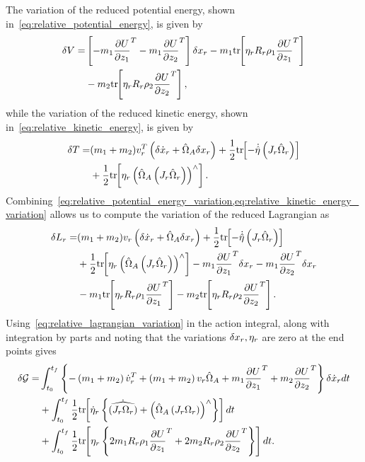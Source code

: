 The variation of the reduced potential energy, shown in~\cref{eq:relative_potential_energy}, is given by
\begin{align}\label{eq:relative_potential_energy_variation}
    \delta V =& \left[ -m_1 \frac{\partial U}{\partial z_1}^T - m_1 \frac{\partial U}{\partial z_2}^T \right] \delta x_r - m_1 \mathrm{tr}\negthickspace\left[  \eta_r R_r \rho_1 \frac{\partial U}{\partial z_1}^T \right] \nonumber\\
              & {} - m_2 \mathrm{tr}\negthickspace\left[ \eta_r R_r \rho_2 \frac{\partial U}{\partial z_2}^T \right],
\end{align}
while the variation of the reduced kinetic energy, shown in~\cref{eq:relative_kinetic_energy}, is given by
\begin{align}\label{eq:relative_kinetic_energy_variation}
    \delta T =& (m_1 + m_2) v_r^T \left( \delta \dot{x}_r +  \hat{\Omega}_A \delta x_r \right) + \frac{1}{2} \mathrm{tr}\negthickspace\left[  -\dot{\hat{\eta}}\left( J_r  \hat{\Omega}_r  \right) \right] \nonumber\\
              & {} +\frac{1}{2} \mathrm{tr}\negthickspace\left[ \eta_r \left(  \hat{\Omega}_A\left( J_r  \hat{\Omega}_r \right) \right)^\wedge \right] .
\end{align}
Combining~\cref{eq:relative_potential_energy_variation,eq:relative_kinetic_energy_variation} allows us to compute the variation of the reduced Lagrangian as
\begin{align}\label{eq:relative_lagrangian_variation}
    \delta L_r =& (m_1 + m_2) v_r \left( \delta \dot{x}_r +  \hat{\Omega}_A \delta x_r \right) + \frac{1}{2} \mathrm{tr}\negthickspace\left[  -\dot{\hat{\eta}}\left( J_r  \hat{\Omega}_r  \right) \right] \nonumber\\
                & {} +\frac{1}{2} \mathrm{tr}\negthickspace\left[ \eta_r \left(  \hat{\Omega}_A\left( J_r  \hat{\Omega}_r \right) \right)^\wedge \right] -m_1 \frac{\partial U}{\partial z_1}^T \delta x_r - m_1 \frac{\partial U}{\partial z_2}^T \delta x_r \nonumber\\
                & {} - m_1 \mathrm{tr}\negthickspace\left[  \eta_r  R_r \rho_1 \frac{\partial U}{\partial z_1}^T \right] - m_2 \mathrm{tr}\negthickspace\left[ \eta_r  R_r \rho_2 \frac{\partial U}{\partial z_2}^T \right].
\end{align}
Using~\cref{eq:relative_lagrangian_variation} in the action integral, along with integration by parts and noting that the variations \( \delta x_r, \eta_r\) are zero at the end points gives 
\begin{align}\label{eq:relative_hamiltons_principle}
    \delta \mathcal{G} =& \int_{t_0}^{t_f} \left\{-\left( m_1+m_2 \right) \dot{v}_r^T + \left( m_1 + m_2 \right) v_r \hat{\Omega}_A + m_1 \frac{\partial U}{\partial z_1}^T + m_2 \frac{\partial U}{\partial z_2}^T \right\}\delta \dot{x}_r  dt \nonumber\\
                        & {} +\int_{t_0}^{t_f} \frac{1}{2} \mathrm{tr}\negthickspace\left[ \dot{\eta}_r \left\{ \dot{\widehat{\left( J_r \Omega_r \right)}} + \left( \hat{\Omega}_A \left( J_r \Omega_r \right) \right)^\wedge  \right\} \right] dt \nonumber\\
                        & {} + \int_{t_0}^{t_f}  \frac{1}{2} \mathrm{tr}\negthickspace\left[ \eta_r  \left\{ 2 m_1R_r \rho_1\frac{\partial U}{\partial z_1}^T + 2 m_2 R_r \rho_2\frac{\partial U}{\partial z_2}^T \right\} \right] dt.
\end{align}
